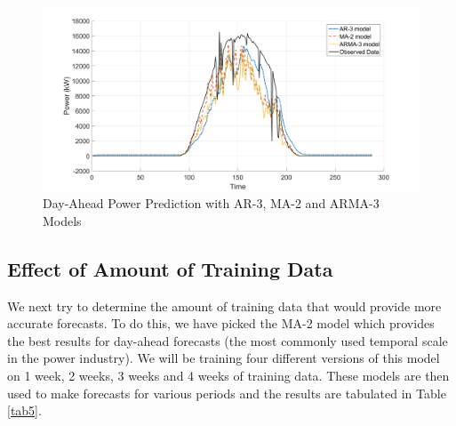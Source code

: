 \documentclass[journal]{IEEEtran}
\begin{document}
\begin{figure}[htpb]
	\centering
	\includegraphics[scale=0.2]{ARMA_model_selection.png}
	\caption{Day-Ahead Power Prediction with AR-3, MA-2 and ARMA-3 Models}
	\label{fig12} %
\end{figure}

\subsection{Effect of Amount of Training Data}

We next try to determine the amount of training data that would provide more accurate forecasts. To do this, we have picked the MA-2 model which provides the best results for day-ahead forecasts (the most commonly used temporal scale in the power industry). We will be training four different versions of this model on 1 week, 2 weeks, 3 weeks and 4 weeks of training data. These models are then used to make forecasts for various periods and the results are tabulated in Table \ref{tab5}.
\end{document}
